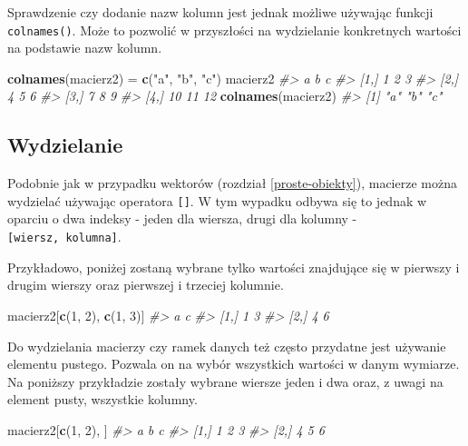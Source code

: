 \documentclass[paper=6in:9in,pagesize=pdftex,headinclude=on,footinclude=on,10pt]{scrbook}
\newenvironment{Shaded}{\begin{snugshade}}{\end{snugshade}}
\newcommand{\CommentTok}[1]{\textcolor[rgb]{0.56,0.35,0.01}{\textit{#1}}}
\newcommand{\DecValTok}[1]{\textcolor[rgb]{0.00,0.00,0.81}{#1}}
\newcommand{\KeywordTok}[1]{\textcolor[rgb]{0.13,0.29,0.53}{\textbf{#1}}}
\newcommand{\NormalTok}[1]{#1}
\newcommand{\StringTok}[1]{\textcolor[rgb]{0.31,0.60,0.02}{#1}}
\begin{document}
Sprawdzenie czy dodanie nazw kolumn jest jednak możliwe używając funkcji \texttt{colnames()}.
Może to pozwolić w przyszłości na wydzielanie konkretnych wartości na podstawie nazw kolumn.

\begin{Shaded}
\begin{Highlighting}[]
\KeywordTok{colnames}\NormalTok{(macierz2) =}\StringTok{ }\KeywordTok{c}\NormalTok{(}\StringTok{"a"}\NormalTok{, }\StringTok{"b"}\NormalTok{, }\StringTok{"c"}\NormalTok{)}
\NormalTok{macierz2}
\CommentTok{#>       a  b  c}
\CommentTok{#> [1,]  1  2  3}
\CommentTok{#> [2,]  4  5  6}
\CommentTok{#> [3,]  7  8  9}
\CommentTok{#> [4,] 10 11 12}
\KeywordTok{colnames}\NormalTok{(macierz2)}
\CommentTok{#> [1] "a" "b" "c"}
\end{Highlighting}
\end{Shaded}

\hypertarget{wydzielanie}{%
\subsection{Wydzielanie}\label{wydzielanie}}

Podobnie jak w przypadku wektorów (rozdział \ref{proste-obiekty}), macierze można wydzielać używając operatora \texttt{{[}{]}}.
W tym wypadku odbywa się to jednak w oparciu o dwa indeksy - jeden dla wiersza, drugi dla kolumny - \texttt{{[}wiersz,\ kolumna{]}}.

Przykładowo, poniżej zostaną wybrane tylko wartości znajdujące się w pierwszy i drugim wierszy oraz pierwszej i trzeciej kolumnie.

\begin{Shaded}
\begin{Highlighting}[]
\NormalTok{macierz2[}\KeywordTok{c}\NormalTok{(}\DecValTok{1}\NormalTok{, }\DecValTok{2}\NormalTok{), }\KeywordTok{c}\NormalTok{(}\DecValTok{1}\NormalTok{, }\DecValTok{3}\NormalTok{)]}
\CommentTok{#>      a c}
\CommentTok{#> [1,] 1 3}
\CommentTok{#> [2,] 4 6}
\end{Highlighting}
\end{Shaded}

Do wydzielania macierzy czy ramek danych też często przydatne jest używanie elementu pustego.
Pozwala on na wybór wszystkich wartości w danym wymiarze.
Na poniższy przykładzie zostały wybrane wiersze jeden i dwa oraz, z uwagi na element pusty, wszystkie kolumny.

\begin{Shaded}
\begin{Highlighting}[]
\NormalTok{macierz2[}\KeywordTok{c}\NormalTok{(}\DecValTok{1}\NormalTok{, }\DecValTok{2}\NormalTok{), ]}
\CommentTok{#>      a b c}
\CommentTok{#> [1,] 1 2 3}
\CommentTok{#> [2,] 4 5 6}
\end{Highlighting}
\end{Shaded}
\end{document}
